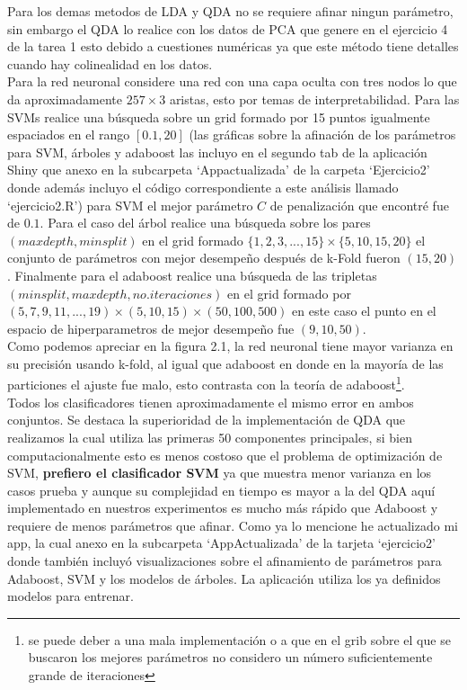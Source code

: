 \documentclass[paper=letter, fontsize=11pt]{scrartcl}
\numberwithin{equation}{section} %
\numberwithin{figure}{section} %
\numberwithin{table}{section} %
\begin{document}
Para los demas metodos de LDA y QDA no se requiere afinar ningun parámetro, sin embargo el QDA lo realice con los datos de PCA que genere en el ejercicio 4 de la tarea 1 esto debido a cuestiones numéricas ya que este método tiene detalles cuando hay colinealidad en los datos.\\ Para la red neuronal considere una red con una capa oculta con tres nodos lo que da aproximadamente $257 \times 3 $ aristas, esto por temas de interpretabilidad. Para las SVMs realice una búsqueda sobre un grid formado por 15 puntos igualmente espaciados en el rango $[0.1, 20]$ (las gráficas sobre la afinación de los parámetros para SVM, árboles y adaboost las incluyo en el segundo tab de la aplicación Shiny que anexo en la subcarpeta ‘Appactualizada’ de la carpeta  ‘Ejercicio2’ donde además incluyo el código correspondiente a este análisis llamado ‘ejercicio2.R’) para SVM el mejor parámetro $C$ de penalización que encontré fue de $0.1$. Para el caso del árbol realice una búsqueda sobre los pares $(maxdepth,minsplit)$ en el grid formado $\{1,2,3,...,15\} \times \{5,10,15,20\}$ el conjunto de parámetros con mejor desempeño después de k-Fold fueron $(15,20 )$. Finalmente para el adaboost realice una búsqueda de las tripletas $(minsplit, maxdepth, no.iteraciones)$ en el grid formado por  $(  5,7,9,11,...,19) \times (5,10,15) \times ( 50,100,500)$ en este caso el punto en el espacio de hiperparametros de mejor desempeño fue $(9,10,50)$.\\
Como podemos apreciar en la figura 2.1, la red neuronal tiene mayor varianza en su precisión usando k-fold, al igual que adaboost en donde en la mayoría de las particiones el ajuste fue malo, esto contrasta con la teoría de adaboost\footnote{se puede deber a una mala implementación o a que en el grib sobre el que se buscaron los mejores parámetros no considero un número suficientemente grande de iteraciones}.\\
Todos los clasificadores tienen aproximadamente el mismo error en ambos conjuntos. Se destaca la superioridad de la implementación de QDA que realizamos la cual utiliza las primeras 50 componentes principales, si bien computacionalmente esto es menos costoso que el problema de optimización de SVM, \textbf{prefiero el clasificador SVM} ya que muestra menor varianza en los casos prueba y aunque su complejidad en tiempo es mayor a la del QDA aquí implementado en nuestros experimentos es mucho más rápido que Adaboost y requiere de menos parámetros que afinar.
Como ya lo mencione he actualizado mi app, la cual anexo en la subcarpeta ‘AppActualizada’ de la tarjeta ‘ejercicio2’ donde también incluyó visualizaciones sobre el afinamiento de parámetros para Adaboost, SVM y los modelos de árboles. La aplicación utiliza los ya definidos modelos para entrenar.\\
\end{document}
